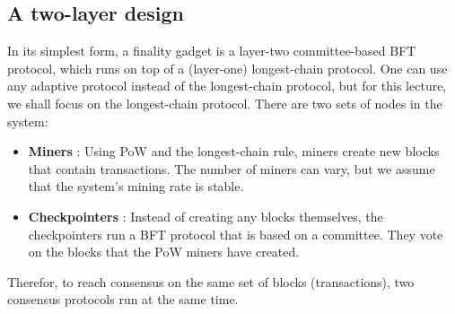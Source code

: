 {	\subsection{A two-layer design}
	In its simplest form, a finality gadget is a layer-two committee-based BFT protocol, which runs on top of a (layer-one) longest-chain protocol. One can use any adaptive protocol instead of the longest-chain protocol, but for this lecture, we shall focus on the longest-chain protocol. There are two sets of nodes in the system:
	\begin{itemize}
		\item \textbf{Miners} : Using PoW and the longest-chain rule, miners create new blocks that contain transactions. The number of miners can vary, but we assume that the system’s mining rate is stable.
		\item \textbf{Checkpointers} : Instead of creating any blocks themselves, the checkpointers run a BFT protocol that is based on a committee. They vote on the blocks that the PoW miners have created.
	\end{itemize}
	Therefor, to reach consensus on the same set of blocks (transactions), two consensus protocols run at the same time.
}
